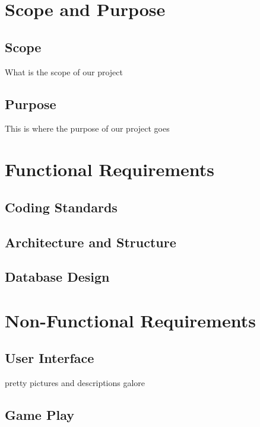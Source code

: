 \documentclass[12pt]{IEEEtran}
\begin{document}
\section{Scope and Purpose}
\label{sec:scope}

\subsection{Scope}
\label{subsec:scope}

What is the scope of our project

\subsection{Purpose}
\label{subsec:purpose}

This is where the purpose of our project goes

\section{Functional Requirements}
\label{sec:funcReq}

\subsection{Coding Standards}
\label{subsec:coding}

\subsection{Architecture and Structure}
\label{subsec:arch}

\subsection{Database Design}
\label{subsec:dbdesign}

\section{Non-Functional Requirements}
\label{sec:nonFuncReq}

\subsection{User Interface}
\label{subsec:ui}

pretty pictures and descriptions galore

\subsection{Game Play}
\label{subsec:gameplay}
\end{document}
